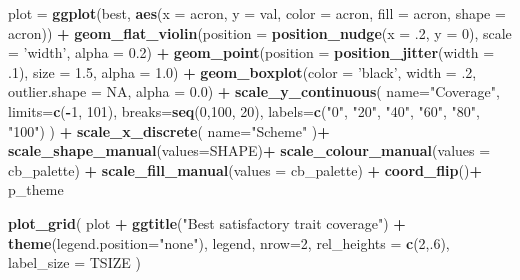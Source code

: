 \documentclass[]{book}
\newenvironment{Shaded}{\begin{snugshade}}{\end{snugshade}}
\newcommand{\DataTypeTok}[1]{\textcolor[rgb]{0.13,0.29,0.53}{#1}}
\newcommand{\DecValTok}[1]{\textcolor[rgb]{0.00,0.00,0.81}{#1}}
\newcommand{\FloatTok}[1]{\textcolor[rgb]{0.00,0.00,0.81}{#1}}
\newcommand{\KeywordTok}[1]{\textcolor[rgb]{0.13,0.29,0.53}{\textbf{#1}}}
\newcommand{\NormalTok}[1]{#1}
\newcommand{\OperatorTok}[1]{\textcolor[rgb]{0.81,0.36,0.00}{\textbf{#1}}}
\newcommand{\OtherTok}[1]{\textcolor[rgb]{0.56,0.35,0.01}{#1}}
\newcommand{\StringTok}[1]{\textcolor[rgb]{0.31,0.60,0.02}{#1}}
\begin{document}
\begin{Shaded}
\begin{Highlighting}[]
\NormalTok{plot =}\StringTok{ }\KeywordTok{ggplot}\NormalTok{(best, }\KeywordTok{aes}\NormalTok{(}\DataTypeTok{x =}\NormalTok{ acron, }\DataTypeTok{y =}\NormalTok{ val, }\DataTypeTok{color =}\NormalTok{ acron, }\DataTypeTok{fill =}\NormalTok{ acron, }\DataTypeTok{shape =}\NormalTok{ acron)) }\OperatorTok{+}
\StringTok{  }\KeywordTok{geom_flat_violin}\NormalTok{(}\DataTypeTok{position =} \KeywordTok{position_nudge}\NormalTok{(}\DataTypeTok{x =} \FloatTok{.2}\NormalTok{, }\DataTypeTok{y =} \DecValTok{0}\NormalTok{), }\DataTypeTok{scale =} \StringTok{'width'}\NormalTok{, }\DataTypeTok{alpha =} \FloatTok{0.2}\NormalTok{) }\OperatorTok{+}
\StringTok{  }\KeywordTok{geom_point}\NormalTok{(}\DataTypeTok{position =} \KeywordTok{position_jitter}\NormalTok{(}\DataTypeTok{width =} \FloatTok{.1}\NormalTok{), }\DataTypeTok{size =} \FloatTok{1.5}\NormalTok{, }\DataTypeTok{alpha =} \FloatTok{1.0}\NormalTok{) }\OperatorTok{+}
\StringTok{  }\KeywordTok{geom_boxplot}\NormalTok{(}\DataTypeTok{color =} \StringTok{'black'}\NormalTok{, }\DataTypeTok{width =} \FloatTok{.2}\NormalTok{, }\DataTypeTok{outlier.shape =} \OtherTok{NA}\NormalTok{, }\DataTypeTok{alpha =} \FloatTok{0.0}\NormalTok{) }\OperatorTok{+}
\StringTok{  }\KeywordTok{scale_y_continuous}\NormalTok{(}
    \DataTypeTok{name=}\StringTok{"Coverage"}\NormalTok{,}
    \DataTypeTok{limits=}\KeywordTok{c}\NormalTok{(}\OperatorTok{-}\DecValTok{1}\NormalTok{, }\DecValTok{101}\NormalTok{),}
    \DataTypeTok{breaks=}\KeywordTok{seq}\NormalTok{(}\DecValTok{0}\NormalTok{,}\DecValTok{100}\NormalTok{, }\DecValTok{20}\NormalTok{),}
    \DataTypeTok{labels=}\KeywordTok{c}\NormalTok{(}\StringTok{"0"}\NormalTok{, }\StringTok{"20"}\NormalTok{, }\StringTok{"40"}\NormalTok{, }\StringTok{"60"}\NormalTok{, }\StringTok{"80"}\NormalTok{, }\StringTok{"100"}\NormalTok{)}
\NormalTok{  ) }\OperatorTok{+}
\StringTok{  }\KeywordTok{scale_x_discrete}\NormalTok{(}
    \DataTypeTok{name=}\StringTok{"Scheme"}
\NormalTok{  )}\OperatorTok{+}
\StringTok{  }\KeywordTok{scale_shape_manual}\NormalTok{(}\DataTypeTok{values=}\NormalTok{SHAPE)}\OperatorTok{+}
\StringTok{  }\KeywordTok{scale_colour_manual}\NormalTok{(}\DataTypeTok{values =}\NormalTok{ cb_palette) }\OperatorTok{+}
\StringTok{  }\KeywordTok{scale_fill_manual}\NormalTok{(}\DataTypeTok{values =}\NormalTok{ cb_palette) }\OperatorTok{+}
\StringTok{  }\KeywordTok{coord_flip}\NormalTok{()}\OperatorTok{+}
\StringTok{  }\NormalTok{p_theme}

\KeywordTok{plot_grid}\NormalTok{(}
\NormalTok{  plot }\OperatorTok{+}
\StringTok{    }\KeywordTok{ggtitle}\NormalTok{(}\StringTok{"Best satisfactory trait coverage"}\NormalTok{) }\OperatorTok{+}
\StringTok{    }\KeywordTok{theme}\NormalTok{(}\DataTypeTok{legend.position=}\StringTok{"none"}\NormalTok{),}
\NormalTok{  legend,}
  \DataTypeTok{nrow=}\DecValTok{2}\NormalTok{,}
  \DataTypeTok{rel_heights =} \KeywordTok{c}\NormalTok{(}\DecValTok{2}\NormalTok{,.}\DecValTok{6}\NormalTok{),}
  \DataTypeTok{label_size =}\NormalTok{ TSIZE}
\NormalTok{)}
\end{Highlighting}
\end{Shaded}
\end{document}
